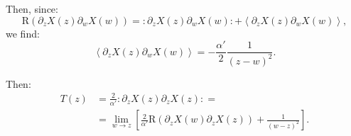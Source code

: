 \documentclass[10pt,a4paper]{article}
\begin{document}
    Then, since:
    \begin{equation*}
        \mathrm{R}\left( \partial_z X\left( z \right) \partial_w X\left( w
        \right) \right) = \colon \partial_z X\left( z \right) \partial_w X\left(
        w \right) \colon + \left\langle \partial_z X\left( z \right) \partial_w
        X\left( w \right) \right\rangle,
    \end{equation*}
    we find:
    \begin{equation*}
        \left\langle \partial_z X\left( z \right) \partial_w X\left( w \right)
        \right\rangle = - \frac{\alpha'}{2} \frac{1}{\left( z - w \right)^2}.
    \end{equation*}

    Then:
    \begin{align*}
        T\left( z \right) &= \frac{2}{\alpha'} \colon \partial_z X\left( z
        \right) \partial_z X\left( z \right) \colon =
        \\
        &= \lim\limits_{w \to z} \left[ \frac{2}{\alpha'} \mathrm{R}\left(
        \partial_z X\left( w \right) \partial_z X\left( z \right) \right) +
        \frac{1}{\left( w - z \right)^2} \right].
    \end{align*}
\end{document}
